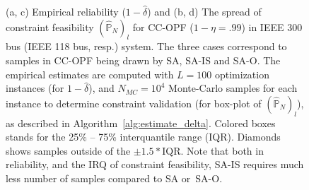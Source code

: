 \begin{figure}[hbt]


\caption{(a, c) Empirical reliability ($1-\hat{\delta}$) and (b, d) The spread of constraint feasibility $(\hat{\mathbb{P}}_N)_l$ for CC-OPF ($1-\eta =.99$) in IEEE 300 bus (IEEE 118 bus, resp.) system. The three cases correspond to samples in CC-OPF being drawn by SA, SA-IS and SA-O. The empirical estimates are computed with $L = 100$ optimization instances (for $1-\hat{\delta}$), and $N_{MC}=10^4$ Monte-Carlo samples for each instance to determine constraint validation (for box-plot of $(\hat{\mathbb{P}}_N)_l$), as described in Algorithm~\ref{alg:estimate_delta}. 
Colored boxes stands for the 25\% -- 75\% interquantile range (IQR). Diamonds shows samples outside of the $\pm 1.5*\text{IQR}$. 
Note that both in reliability, and the IRQ of constraint feasibility, SA-IS requires much less number of samples compared to SA or~SA-O.}
\label{fig:ieee118}
\end{figure}

